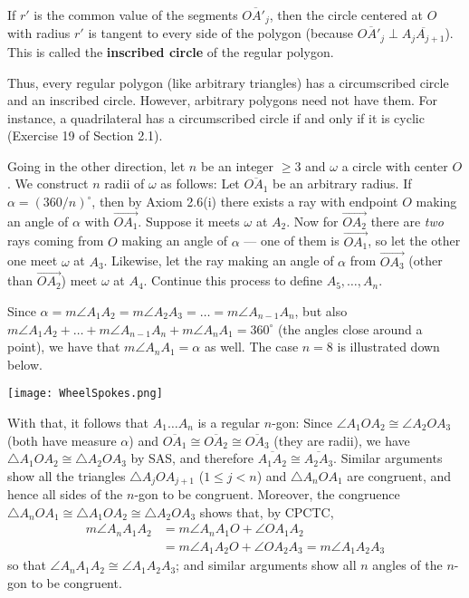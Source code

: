 \documentclass[leqno]{book}
\begin{document}
If $r'$ is the common value of the segments $\overline{OA'_j}$, then the circle centered at $O$ with radius $r'$ is tangent to every side of the polygon (because $\overline{OA'_j}\perp\overline{A_jA_{j+1}}$).  This is called the \textbf{inscribed circle} of the regular polygon.

Thus, every regular polygon (like arbitrary triangles) has a circumscribed circle and an inscribed circle.  However, arbitrary polygons need not have them.  For instance, a quadrilateral has a circumscribed circle if and only if it is cyclic (Exercise 19 of Section 2.1).

Going in the other direction, let $n$ be an integer $\geqslant 3$ and $\omega$ a circle with center $O$.  We construct $n$ radii of $\omega$ as follows: Let $\overline{OA_1}$ be an arbitrary radius.  If $\alpha=(360/n)^\circ$, then by Axiom 2.6(i) there exists a ray with endpoint $O$ making an angle of $\alpha$ with $\overset{\longrightarrow}{OA_1}$.  Suppose it meets $\omega$ at $A_2$.  Now for $\overset{\longrightarrow}{OA_2}$ there are \emph{two} rays coming from $O$ making an angle of $\alpha$ \---- one of them is $\overset{\longrightarrow}{OA_1}$, so let the other one meet $\omega$ at $A_3$.  Likewise, let the ray making an angle of $\alpha$ from $\overset{\longrightarrow}{OA_3}$ (other than $\overset{\longrightarrow}{OA_2}$) meet $\omega$ at $A_4$.  Continue this process to define $A_5,\dots,A_n$.

Since $\alpha=m\angle A_1A_2=m\angle A_2A_3=\dots=m\angle A_{n-1}A_n$, but also $m\angle A_1A_2+\dots+m\angle A_{n-1}A_n+m\angle A_nA_1=360^\circ$ (the angles close around a point), we have that $m\angle A_nA_1=\alpha$ as well.  The case $n=8$ is illustrated down below.
\begin{center}\texttt{[image: WheelSpokes.png]}\end{center}
With that, it follows that $A_1\dots A_n$ is a regular $n$-gon: Since $\angle A_1OA_2\cong\angle A_2OA_3$ (both have measure $\alpha$) and $\overline{OA_1}\cong\overline{OA_2}\cong\overline{OA_3}$ (they are radii), we have $\triangle A_1OA_2\cong\triangle A_2OA_3$ by SAS, and therefore $\overline{A_1A_2}\cong\overline{A_2A_3}$.  Similar arguments show all the triangles $\triangle A_jOA_{j+1}$ ($1\leqslant j<n$) and $\triangle A_nOA_1$ are congruent, and hence all sides of the $n$-gon to be congruent.  Moreover, the congruence $\triangle A_nOA_1\cong\triangle A_1OA_2\cong\triangle A_2OA_3$ shows that, by CPCTC,
\begin{align*}
m\angle A_nA_1A_2 & =m\angle A_nA_1O+\angle OA_1A_2 \\
& =m\angle A_1A_2O+\angle OA_2A_3 = m\angle A_1A_2A_3
\end{align*}
so that $\angle A_nA_1A_2\cong\angle A_1A_2A_3$; and similar arguments show all $n$ angles of the $n$-gon to be congruent.
\end{document}
